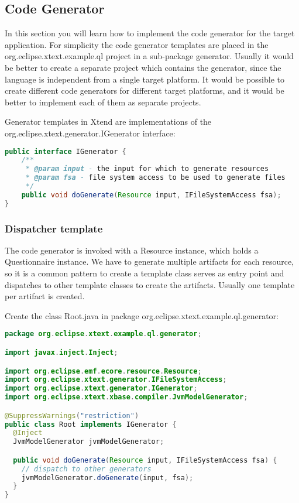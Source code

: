 \subsection{Code Generator}

In this section you will learn how to implement the code generator for 
the target application. For simplicity the code generator templates are placed in the
org.eclipse.xtext.example.ql project in a sub-package generator. 
Usually it would be better to create a separate project which contains the generator,
since the language is independent from a single target platform. It would
be possible to create different code generators for different target platforms,
and it would be better to implement each of them as separate projects.

Generator templates in Xtend are implementations of the org.eclipse.xtext.generator.IGenerator
interface:

\begin{lstlisting}[language=Java]
public interface IGenerator {
	/**
	 * @param input - the input for which to generate resources
	 * @param fsa - file system access to be used to generate files
	 */
	public void doGenerate(Resource input, IFileSystemAccess fsa);
}
\end{lstlisting}

\subsubsection {Dispatcher template}

The code generator is invoked with a Resource instance, which holds a Questionnaire
instance. We have to generate multiple artifacts for each resource, so it is a common 
pattern to create a template class serves as entry point and dispatches to other
template classes to create the artifacts. Usually one template per artifact is
created.

Create the class Root.java in package org.eclipse.xtext.example.ql.generator:

\begin{lstlisting}[language=Java]
package org.eclipse.xtext.example.ql.generator;

import javax.inject.Inject;

import org.eclipse.emf.ecore.resource.Resource;
import org.eclipse.xtext.generator.IFileSystemAccess;
import org.eclipse.xtext.generator.IGenerator;
import org.eclipse.xtext.xbase.compiler.JvmModelGenerator;

@SuppressWarnings("restriction")
public class Root implements IGenerator {
  @Inject
  JvmModelGenerator jvmModelGenerator;

  public void doGenerate(Resource input, IFileSystemAccess fsa) {
    // dispatch to other generators
    jvmModelGenerator.doGenerate(input, fsa);
  }
}
\end{lstlisting}

